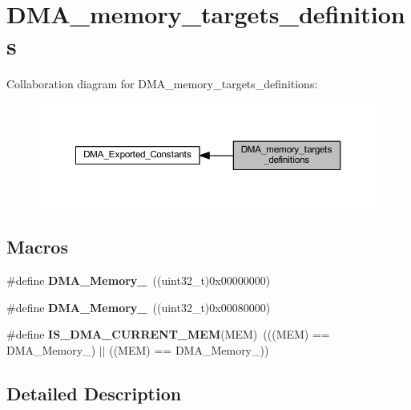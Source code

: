 \hypertarget{group___d_m_a__memory__targets__definitions}{}\section{D\+M\+A\+\_\+memory\+\_\+targets\+\_\+definitions}
\label{group___d_m_a__memory__targets__definitions}
Collaboration diagram for D\+M\+A\+\_\+memory\+\_\+targets\+\_\+definitions\+:
\nopagebreak
\begin{figure}[H]
\begin{center}
\leavevmode
\includegraphics[width=350pt]{group___d_m_a__memory__targets__definitions}
\end{center}
\end{figure}
\subsection*{Macros}
\begin{DoxyCompactItemize}
\item 
\mbox{\label{group___d_m_a__memory__targets__definitions_gadb576bccef5f2fc65fe9b451033bdc95}} 
\#define {\bfseries D\+M\+A\+\_\+\+Memory\+\_}~((uint32\+\_\+t)0x00000000)
\item 
\mbox{\label{group___d_m_a__memory__targets__definitions_ga6d1e13631e4ef9a013d078e613fd7fd5}} 
\#define {\bfseries D\+M\+A\+\_\+\+Memory\+\_}~((uint32\+\_\+t)0x00080000)
\item 
\mbox{\label{group___d_m_a__memory__targets__definitions_ga87d6abab18d2b4bb86db909854cc1f02}} 
\#define {\bfseries I\+S\+\_\+\+D\+M\+A\+\_\+\+C\+U\+R\+R\+E\+N\+T\+\_\+\+M\+EM}(M\+EM)~(((M\+EM) == D\+M\+A\+\_\+\+Memory\+\_) $\vert$$\vert$ ((M\+EM) == D\+M\+A\+\_\+\+Memory\+\_))
\end{DoxyCompactItemize}


\subsection{Detailed Description}
